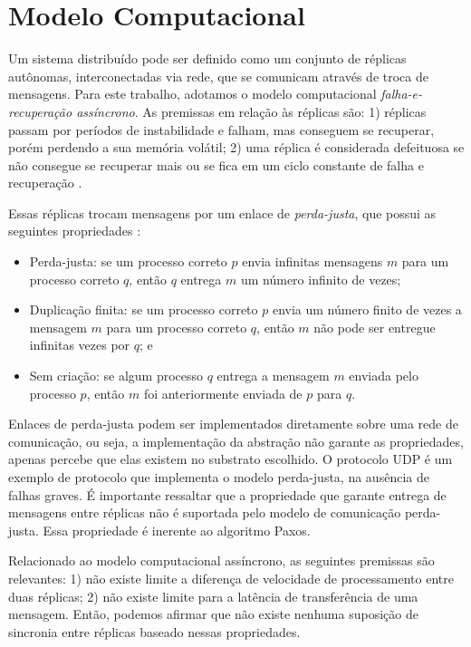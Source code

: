 \section{Modelo Computacional}\label{sec:modelo-computacional}

Um sistema distribuído pode ser definido como um conjunto de réplicas autônomas,
interconectadas via rede, que se comunicam através de troca de mensagens. Para este
trabalho, adotamos o modelo computacional \emph{falha-e-recuperação assíncrono}. As
premissas em relação às réplicas são: 1) réplicas passam por períodos de instabilidade e
falham, mas conseguem se recuperar, porém perdendo a sua memória volátil; 2) uma réplica é
considerada defeituosa se não consegue se recuperar mais ou se fica em um ciclo constante
de falha e recuperação \cite{cachin11}.

Essas réplicas trocam mensagens por um enlace de \emph{perda-justa}, que possui as
seguintes propriedades \cite{cachin11}:

\begin{itemize}
  \item Perda-justa: se um processo correto $p$ envia infinitas mensagens $m$ para um
    processo correto $q$, então $q$ entrega $m$ um número infinito de vezes;
  \item Duplicação finita: se um processo correto $p$ envia um número finito de vezes a
    mensagem $m$ para um processo correto $q$, então $m$ não pode ser entregue infinitas
    vezes por $q$; e
  \item Sem criação: se algum processo $q$ entrega a mensagem $m$ enviada pelo processo
    $p$, então $m$ foi anteriormente enviada de $p$ para $q$.
\end{itemize}

Enlaces de perda-justa podem ser implementados diretamente sobre uma rede de comunicação,
ou seja, a implementação da abstração não garante as propriedades, apenas percebe que elas
existem no substrato escolhido. O protocolo UDP é um exemplo de protocolo que implementa o
modelo perda-justa, na ausência de falhas graves. É importante ressaltar que a propriedade
que garante entrega de mensagens entre réplicas não é suportada pelo modelo de comunicação
perda-justa. Essa propriedade é inerente ao algoritmo Paxos.

Relacionado ao modelo computacional assíncrono, as seguintes premissas são relevantes: 1)
não existe limite a diferença de velocidade de processamento entre duas réplicas; 2) não
existe limite para a latência de transferência de uma mensagem. Então, podemos afirmar que
não existe nenhuma suposição de sincronia entre réplicas baseado nessas propriedades.

